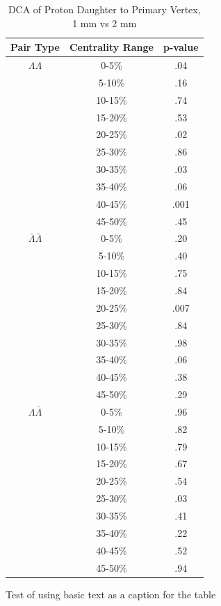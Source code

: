 \begin{table}
\caption {DCA of Proton Daughter to Primary Vertex, 1 mm vs 2 mm} \label{tab:DcaProtonPvalueTests1mmVs2mm}
\begin{center}
\begin{tabular}{| c | c | c |}
  \hline                       
  Pair Type & Centrality Range & p-value \\
  \hline
  $\Lambda\Lambda$ & 0-5\% & .04 \\
   & 5-10\%  & .16 \\
   & 10-15\% & .74 \\
   & 15-20\% & .53 \\
   & 20-25\% & .02 \\
   & 25-30\% & .86 \\
   & 30-35\% & .03 \\
   & 35-40\% & .06 \\
   & 40-45\% & .001 \\
   & 45-50\% & .45 \\
   \hline
  $\bar{\Lambda}\bar{\Lambda}$ &  0-5\% & .20 \\
   & 5-10\% & .40 \\
   & 10-15\% & .75 \\
   & 15-20\% & .84 \\
   & 20-25\% & .007 \\
   & 25-30\% & .84 \\
   & 30-35\% & .98 \\
   & 35-40\% & .06 \\
   & 40-45\% & .38 \\
   & 45-50\% & .29 \\
   \hline
  $\Lambda\bar{\Lambda}$ &  0-5\% & .96 \\
   & 5-10\% & .82 \\
   & 10-15\% & .79 \\
   & 15-20\% & .67 \\
   & 20-25\% & .54 \\
   & 25-30\% & .03 \\
   & 30-35\% & .41 \\
   & 35-40\% & .22 \\
   & 40-45\% & .52 \\
   & 45-50\% & .94 \\
  \hline  
\end{tabular}
Test of using basic text as a caption for the table
\end{center}
\end{table}



